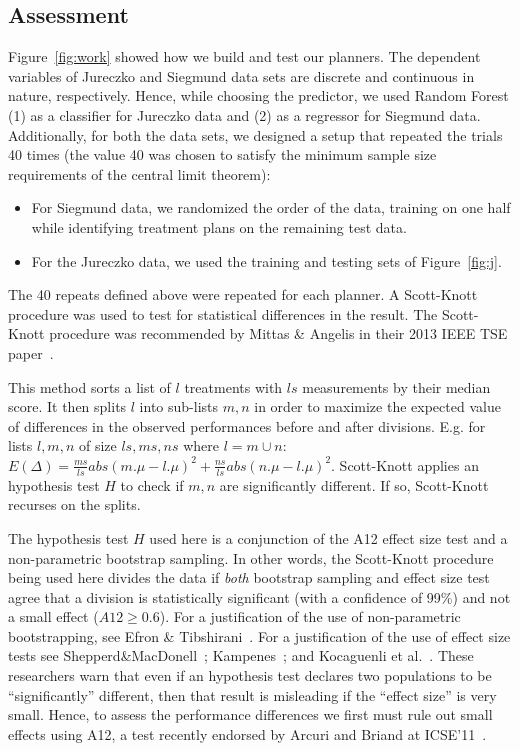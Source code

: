 \documentclass{sig-alternate}
\newcommand{\bi}{\begin{itemize}}
\newcommand{\ei}{\end{itemize}}
\newcommand{\fig}[1]{Figure~\ref{fig:#1}}
\begin{document}
\subsection{Assessment}
\fig{work} showed how we build and test our planners. The dependent variables of Jureczko and Siegmund data sets are discrete and continuous in nature, respectively. Hence, while choosing the predictor, we used Random Forest (1) as a classifier for Jureczko data and (2) as a regressor for Siegmund data. Additionally, for both the data sets, we designed a setup that repeated the trials 40 times (the value 40 was chosen to satisfy the minimum sample size requirements of the central limit theorem):
\bi
\item For Siegmund data, we randomized the order of the data, training on one half while identifying treatment plans on the remaining test data.
\item For the Jureczko data, we used the training and testing sets of \fig{j}. 
\ei
The 40 repeats defined above were repeated for each planner. A Scott-Knott procedure was used to test for statistical differences in the result. The Scott-Knott procedure was recommended by Mittas \& Angelis in their 2013 IEEE TSE paper~\cite{mittas13}.

This method
sorts a list of $l$ treatments with $ls$ measurements by their median
score. It then
splits $l$ into sub-lists $m,n$ in order to maximize the expected value of
 differences  in the observed performances
before and after divisions. E.g. for lists $l,m,n$ of size $ls,ms,ns$ where $l=m\cup n$:
 $E(\Delta)=\frac{ms}{ls}abs(m.\mu - l.\mu)^2 + \frac{ns}{ls}abs(n.\mu - l.\mu)^2$.
Scott-Knott  applies an  hypothesis test $H$ to check
if $m,n$ are significantly different. If so, Scott-Knott  recurses on the splits.

The hypothesis test $H$ used here is a conjunction of the A12 effect size test and a non-parametric bootstrap sampling. In other words, the Scott-Knott procedure being used here divides the data if \textit{both} bootstrap sampling and effect size test agree that a division is statistically significant (with a confidence of 99\%) and not a small effect ($A12 \ge 0.6$). For a justification of the use of non-parametric bootstrapping, see Efron \& Tibshirani~\cite[p220-223]{efron93}. For a justification of the use of effect size tests see Shepperd\&MacDonell~\cite{shepperd12a}; Kampenes~\cite{kampenes07}; and Kocaguenli et al.~\cite{Kocaguneli2013:ep}. These researchers warn that even if an hypothesis test declares two populations to be ``significantly'' different, then that result is misleading if the ``effect size'' is very small. Hence, to assess the performance differences we first must rule out small effects using A12, a test   recently endorsed by Arcuri and Briand at ICSE'11~\cite{arcuri11}.
\end{document}
